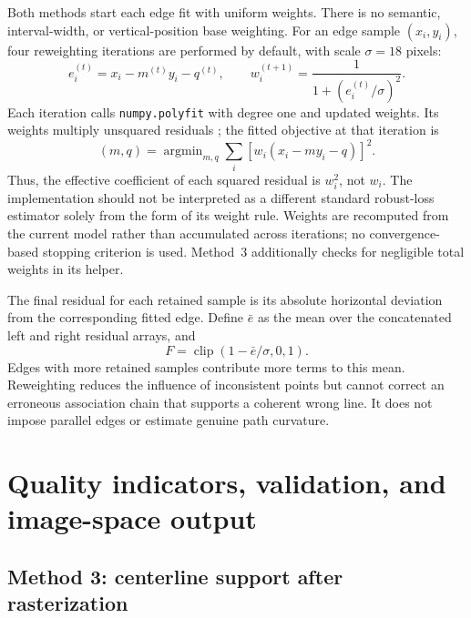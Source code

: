 Both methods start each edge fit with uniform weights. There is no
semantic, interval-width, or vertical-position base weighting. For an
edge sample $(x_i,y_i)$, four reweighting iterations are performed by
default, with scale $\sigma=18$ pixels:
\begin{equation}
    e_i^{(t)}=x_i-m^{(t)}y_i-q^{(t)},\qquad
    w_i^{(t+1)}=\frac{1}{1+(e_i^{(t)}/\sigma)^2}.
    \label{eq:c4_reweight}
\end{equation}
Each iteration calls \texttt{numpy.polyfit} with degree one and updated
weights. Its weights multiply unsquared residuals
\cite{numpyPolyfitDocumentation}; the fitted objective at that iteration is
\begin{equation}
    (m,q)=\mathop{\arg\min}_{m,q}
        \sum_i \left[w_i(x_i-my_i-q)\right]^2.
    \label{eq:c4_objective}
\end{equation}
Thus, the effective coefficient of each squared residual is $w_i^2$,
not $w_i$. The implementation should not be interpreted as a different
standard robust-loss estimator solely from the form of its weight rule.
Weights are recomputed from the current model rather than accumulated
across iterations; no convergence-based stopping criterion is used.
Method~3 additionally checks for negligible total weights in its helper.

The final residual for each retained sample is its absolute horizontal
deviation from the corresponding fitted edge. Define $\bar e$ as the
mean over the concatenated left and right residual arrays, and
\begin{equation}
    F=\operatorname{clip}(1-\bar e/\sigma,0,1).
    \label{eq:c4_fit_score}
\end{equation}
Edges with more retained samples contribute more terms to this mean.
Reweighting reduces the influence of inconsistent points but cannot
correct an erroneous association chain that supports a coherent wrong
line. It does not impose parallel edges or estimate genuine path curvature.

\section{Quality indicators, validation, and image-space output}
\label{sec:c4_output}

\subsection{Method 3: centerline support after rasterization}
\label{subsec:c4_output3}

